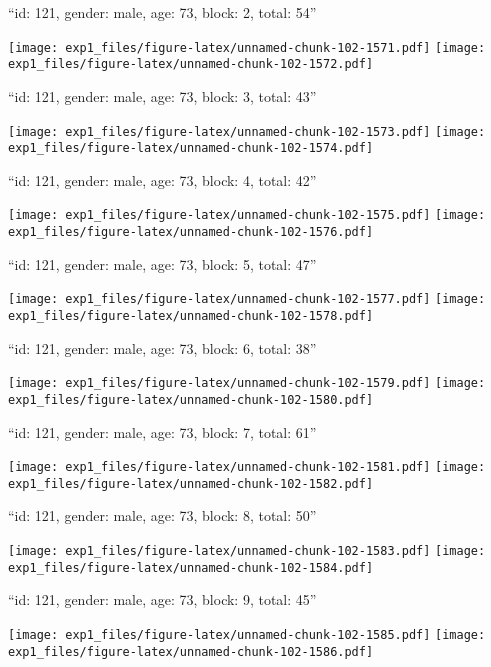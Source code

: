 \documentclass[11pt,,]{article}
\begin{document}
\newpage
[1] 

``id: 121, gender: male, age: 73, block: 2, total: 54''

\texttt{[image: exp1\_files/figure-latex/unnamed-chunk-102-1571.pdf]}
\texttt{[image: exp1\_files/figure-latex/unnamed-chunk-102-1572.pdf]}

\newpage
[1] 

``id: 121, gender: male, age: 73, block: 3, total: 43''

\texttt{[image: exp1\_files/figure-latex/unnamed-chunk-102-1573.pdf]}
\texttt{[image: exp1\_files/figure-latex/unnamed-chunk-102-1574.pdf]}

\newpage
[1] 

``id: 121, gender: male, age: 73, block: 4, total: 42''

\texttt{[image: exp1\_files/figure-latex/unnamed-chunk-102-1575.pdf]}
\texttt{[image: exp1\_files/figure-latex/unnamed-chunk-102-1576.pdf]}

\newpage
[1] 

``id: 121, gender: male, age: 73, block: 5, total: 47''

\texttt{[image: exp1\_files/figure-latex/unnamed-chunk-102-1577.pdf]}
\texttt{[image: exp1\_files/figure-latex/unnamed-chunk-102-1578.pdf]}

\newpage
[1] 

``id: 121, gender: male, age: 73, block: 6, total: 38''

\texttt{[image: exp1\_files/figure-latex/unnamed-chunk-102-1579.pdf]}
\texttt{[image: exp1\_files/figure-latex/unnamed-chunk-102-1580.pdf]}

\newpage
[1] 

``id: 121, gender: male, age: 73, block: 7, total: 61''

\texttt{[image: exp1\_files/figure-latex/unnamed-chunk-102-1581.pdf]}
\texttt{[image: exp1\_files/figure-latex/unnamed-chunk-102-1582.pdf]}

\newpage
[1] 

``id: 121, gender: male, age: 73, block: 8, total: 50''

\texttt{[image: exp1\_files/figure-latex/unnamed-chunk-102-1583.pdf]}
\texttt{[image: exp1\_files/figure-latex/unnamed-chunk-102-1584.pdf]}

\newpage
[1] 

``id: 121, gender: male, age: 73, block: 9, total: 45''

\texttt{[image: exp1\_files/figure-latex/unnamed-chunk-102-1585.pdf]}
\texttt{[image: exp1\_files/figure-latex/unnamed-chunk-102-1586.pdf]}
\end{document}
